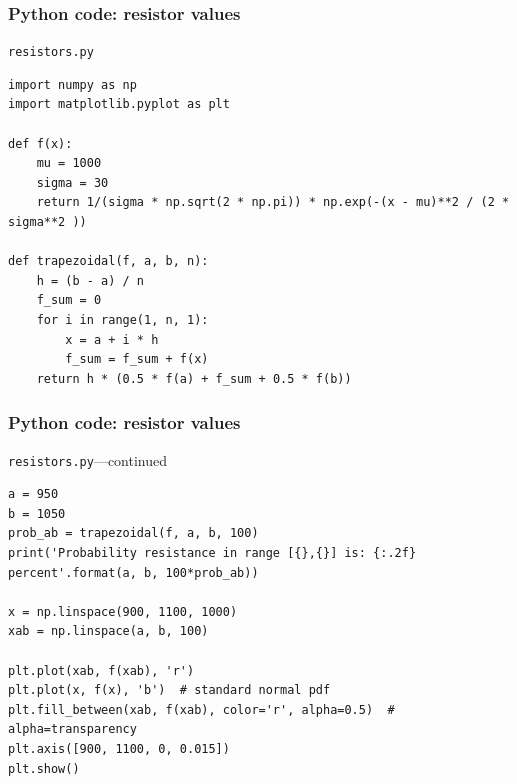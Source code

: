 \documentclass[english,14pt]{beamer}
\begin{document}

\begin{frame}[fragile]

\frametitle{Python code: resistor values}

\vspace*{-3mm}

\texttt{resistors.py}
\vspace*{-1mm}
\begin{lstlisting}[style=CStyle,basicstyle=\scriptsize]
import numpy as np
import matplotlib.pyplot as plt

def f(x):
    mu = 1000
    sigma = 30
    return 1/(sigma * np.sqrt(2 * np.pi)) * np.exp(-(x - mu)**2 / (2 * sigma**2 ))

def trapezoidal(f, a, b, n):
    h = (b - a) / n
    f_sum = 0
    for i in range(1, n, 1):
        x = a + i * h
        f_sum = f_sum + f(x)
    return h * (0.5 * f(a) + f_sum + 0.5 * f(b))
\end{lstlisting}

\end{frame}


\begin{frame}[fragile]

\frametitle{Python code: resistor values}

\vspace*{-3mm}

\texttt{resistors.py}---continued
\vspace*{-1mm}
\begin{lstlisting}[style=CStyle,basicstyle=\scriptsize]
a = 950
b = 1050
prob_ab = trapezoidal(f, a, b, 100)
print('Probability resistance in range [{},{}] is: {:.2f} percent'.format(a, b, 100*prob_ab))

x = np.linspace(900, 1100, 1000)
xab = np.linspace(a, b, 100)

plt.plot(xab, f(xab), 'r')
plt.plot(x, f(x), 'b')  # standard normal pdf
plt.fill_between(xab, f(xab), color='r', alpha=0.5)  # alpha=transparency
plt.axis([900, 1100, 0, 0.015])
plt.show()
\end{lstlisting}

\end{frame}

\end{document}
